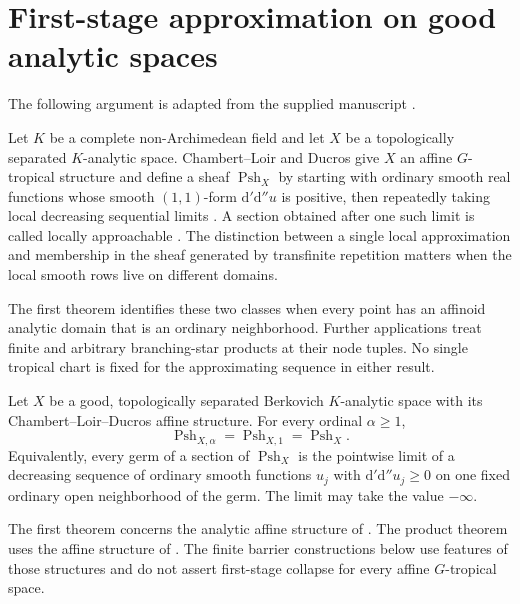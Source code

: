 \section{First-stage approximation on good analytic spaces}
\label{sec:supplied-p071a}

The following argument is adapted from the supplied manuscript
\cite{SuppliedP071Good20260924}.

\label{sec:supplied-p071a-introduction}

Let $K$ be a complete non-Archimedean field and let $X$ be a topologically separated $K$-analytic space. Chambert--Loir and Ducros give $X$ an affine $G$-tropical structure and define a sheaf $\operatorname{Psh}_X$ by starting with ordinary smooth real functions whose smooth $(1,1)$-form $\mathrm{d}'\mathrm{d}''u$ is positive, then repeatedly taking local decreasing sequential limits \cite[\S12.4.6, Definition~8.1.1 and Lemma~8.1.4]{CLD25}. A section obtained after one such limit is called locally approachable \cite[Definition~8.1.13]{CLD25}. The distinction between a single local approximation and membership in the sheaf generated by transfinite repetition matters when the local smooth rows live on different domains.

The first theorem identifies these two classes when every point has an affinoid analytic domain that is an ordinary neighborhood. Further applications treat finite and arbitrary branching-star products at their node tuples. No single tropical chart is fixed for the approximating sequence in either result.

\begin{theorem}
\label{thm:supplied-p071a-analytic-first-stage}
Let $X$ be a good, topologically separated Berkovich $K$-analytic space with its Chambert--Loir--Ducros affine structure. For every ordinal $\alpha\geq1$,
\[
\operatorname{Psh}_{X,\alpha}=\operatorname{Psh}_{X,1}=\operatorname{Psh}_X.
\]
Equivalently, every germ of a section of $\operatorname{Psh}_X$ is the pointwise limit of a decreasing sequence of ordinary smooth functions $u_j$ with $\mathrm{d}'\mathrm{d}''u_j\geq0$ on one fixed ordinary open neighborhood of the germ. The limit may take the value $-\infty$.
\end{theorem}

The first theorem concerns the analytic affine structure of \cite[\S12.4.6]{CLD25}. The product theorem uses the affine structure of \cite[\S9.1]{CLD25}. The finite barrier constructions below use features of those structures and do not assert first-stage collapse for every affine $G$-tropical space.

